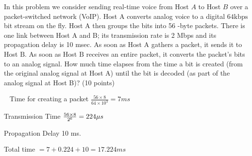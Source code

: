 \begin{exercise}[]{In this problem we consider sending real-time voice from Host $A$ to Host $B$ over a packet-switched network (VoIP). Host A converts analog voice to a digital $64 \mathrm{kbps}$ bit stream on the fly. Host A then groups the bits into 56 -byte packets. There is one link between Host A and B; its transmission rate is 2 Mbps and its propagation delay is 10 msec. As soon as Host A gathers a packet, it sends it to Host $\mathrm{B}$. As soon as Host $\mathrm{B}$ receives an entire packet, it converts the packet's bits to an analog signal. How much time elapses from the time a bit is created (from the original analog signal at Host A) until the bit is decoded (as part of the analog signal at Host B)? (10 points)}
  \begin{solution}
  \par{~}
  Time for creating a packet $\frac{56 \times 8}{64 \times 10^3} = 7 ms$

  Transmission Time $\frac{56 \times 8}{2 \time 10^6} = 224 \mu s$

  Propagation Delay 10 ms.

  Total time $= 7 + 0.224 + 10 = 17.224 ms$
  \end{solution}
  \label{ex1}
\end{exercise}



